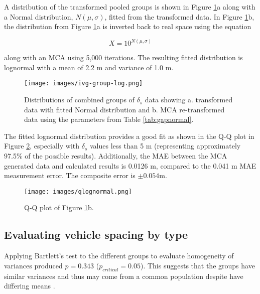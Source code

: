 A distribution of the transformed pooled groups is shown in Figure \ref{fig:ivgloggroup}a along with a Normal distribution, $N(\mu,\sigma)$, fitted from the transformed data. In Figure \ref{fig:ivgloggroup}b, the distribution from Figure \ref{fig:ivgloggroup}a is inverted back to real space using the equation

\begin{equation}
\label{inverse-10}
X = 10^{N(\mu,\sigma)}
\end{equation}

along with an MCA using 5,000 iterations. The resulting fitted distribution is lognormal with a mean of 2.2 m and variance of 1.0 m. 
 
\begin{figure}[H]
\texttt{[image: images/ivg-group-log.png]} 
\caption[Distributions of combined groups of $\delta_{s}$ data.]{Distributions of combined groups of $\delta_{s}$ data showing a. transformed data with fitted Normal distribution and b. MCA re-transformed data using the parameters from Table \ref{tab:gapnormal}.}
\label{fig:ivgloggroup}
\end{figure}

The fitted lognormal distribution provides a good fit as shown in the Q-Q plot in Figure \ref{fig:qlognormal}, especially with  $\delta_{s}$ values less than 5 m (representing approximately 97.5\% of the possible results). Additionally, the MAE between the MCA generated data and calculated  results is 0.0126 m, compared to the 0.041 m MAE measurement error. The composite error is $\pm 0.054$m.

\begin{figure}[H]
\texttt{[image: images/qlognormal.png]} 
\caption{Q-Q plot of Figure \ref{fig:ivgloggroup}b.}
\label{fig:qlognormal}
\end{figure}

\subsection{Evaluating vehicle spacing by type}
Applying Bartlett's test to the different groups to evaluate homogeneity of variances produced $p = 0.343$ ($p_{critical} = 0.05$). This  suggests that the groups have similar variances and thus may come from a common population despite have differing means \citep{NIST2013}.

